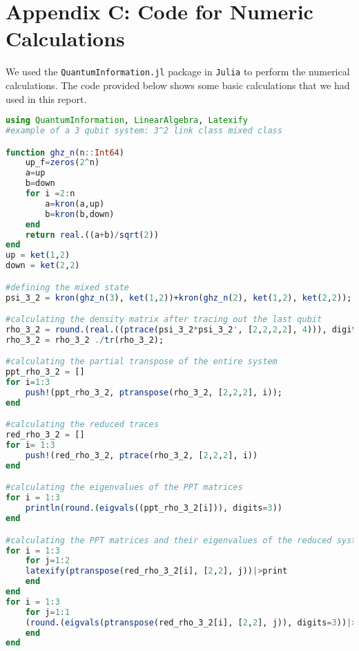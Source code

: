 \documentclass{scrartcl}
\begin{document}
\section*{Appendix C: {\huge Code for Numeric Calculations}}
We used the \texttt{QuantumInformation.jl} package in \texttt{Julia} to perform the numerical calculations. The code provided below shows some basic calculations that we had used in this report. 
\begin{lstlisting}[language=Julia,label={lst:transmission}]
using QuantumInformation, LinearAlgebra, Latexify 
#example of a 3 qubit system: 3^2 link class mixed class

function ghz_n(n::Int64)
    up_f=zeros(2^n)
    a=up
    b=down
    for i =2:n 
        a=kron(a,up)
        b=kron(b,down)
    end
    return real.((a+b)/sqrt(2))
end
up = ket(1,2)
down = ket(2,2)

#defining the mixed state 
psi_3_2 = kron(ghz_n(3), ket(1,2))+kron(ghz_n(2), ket(1,2), ket(2,2));

#calculating the density matrix after tracing out the last qubit
rho_3_2 = round.(real.((ptrace(psi_3_2*psi_3_2', [2,2,2,2], 4))), digits=3) 
rho_3_2 = rho_3_2 ./tr(rho_3_2);

#calculating the partial transpose of the entire system
ppt_rho_3_2 = []
for i=1:3
    push!(ppt_rho_3_2, ptranspose(rho_3_2, [2,2,2], i));
end

#calculating the reduced traces 
red_rho_3_2 = []
for i= 1:3
    push!(red_rho_3_2, ptrace(rho_3_2, [2,2,2], i))
end

#calculating the eigenvalues of the PPT matrices
for i = 1:3
    println(round.(eigvals((ppt_rho_3_2[i])), digits=3))
end

#calculating the PPT matrices and their eigenvalues of the reduced system
for i = 1:3
    for j=1:2
    latexify(ptranspose(red_rho_3_2[i], [2,2], j))|>print
    end
end
for i = 1:3
    for j=1:1
    (round.(eigvals(ptranspose(red_rho_3_2[i], [2,2], j)), digits=3))|>println
    end
end
\end{lstlisting}

\newpage

\end{document}
